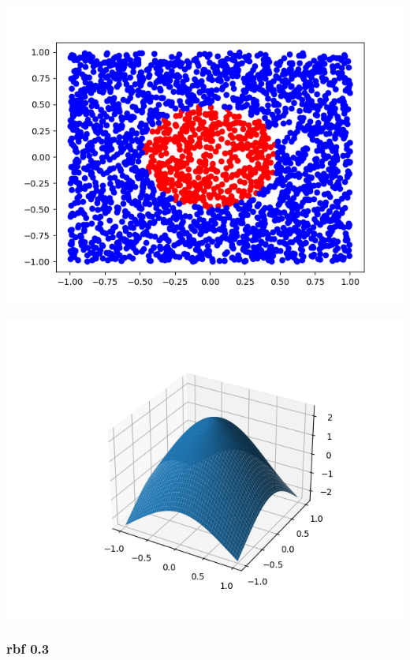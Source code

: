 \documentclass[11pt]{article}
\begin{document}
\begin{center}
\includegraphics[scale=0.7]{./res/ac_points_rbf_0.2.png}
\end{center}

\begin{center}
\includegraphics[scale=0.7]{./res/ac_surface_rbf_0.2.png}
\end{center}

\subsubsection*{rbf 0.3}
\label{sec:org998b7cb}
\end{document}

